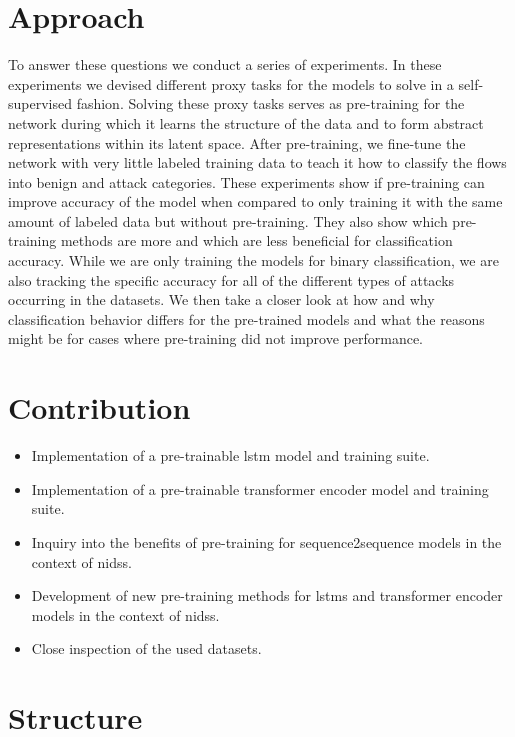 \section{Approach} \label{sect.approach}

To answer these questions we conduct a series of experiments. In these experiments we devised different proxy tasks for the models to solve in a self-supervised fashion. Solving these proxy tasks serves as pre-training for the network during which it learns the structure of the data and to form abstract representations within its latent space. After pre-training, we fine-tune the network with very little labeled training data to teach it how to classify the flows into benign and attack categories. These experiments show if pre-training can improve accuracy of the model when compared to only training it with the same amount of labeled data but without pre-training. They also show which pre-training methods are more and which are less beneficial for classification accuracy. 
While we are only training the models for binary classification, we are also tracking the specific accuracy for all of the different types of attacks occurring in the datasets. We then take a closer look at how and why classification behavior differs for the pre-trained models and what the reasons might be for cases where pre-training did not improve performance.

\section{Contribution} \label{sect.contribution}

\begin{itemize}
	\item Implementation of a pre-trainable \gls{lstm} model and training suite.
	\item Implementation of a pre-trainable transformer encoder model and training suite.
	\item Inquiry into the benefits of pre-training for sequence2sequence models in the context of \glspl{nids}.
	\item Development of new pre-training methods for \glspl{lstm} and transformer encoder models in the context of \glspl{nids}.
	\item Close inspection of the used datasets.
\end{itemize}

\section{Structure} \label{sect.structure}

